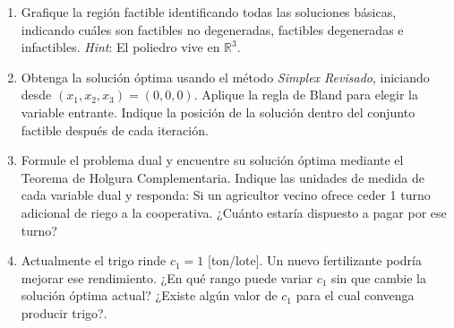 \begin{enumerate}[label=\arabic*.]
  \item Grafique la región factible identificando todas las soluciones básicas, indicando cuáles son factibles no degeneradas, factibles degeneradas e infactibles. \textit{Hint}: El poliedro vive en $\mathbb{R}^3$.

  \item Obtenga la solución óptima usando el método \textit{Simplex Revisado}, iniciando desde $(x_1,x_2,x_3)=(0,0,0)$. Aplique la regla de Bland para elegir la variable entrante. Indique la posición de la solución dentro del conjunto factible después de cada iteración.

  \item Formule el problema dual y encuentre su solución óptima mediante el Teorema de Holgura Complementaria. Indique las unidades de medida de cada variable dual y responda: Si un agricultor vecino ofrece ceder 1 turno adicional de riego a la cooperativa. ¿Cuánto estaría dispuesto a pagar por ese turno?

  \item Actualmente el trigo rinde $c_1 = 1$ [ton/lote]. Un nuevo fertilizante podría mejorar ese rendimiento. ¿En qué rango puede variar $c_1$ sin que cambie la solución óptima actual? ¿Existe algún valor de $c_1$ para el cual convenga producir trigo?.
\end{enumerate}
